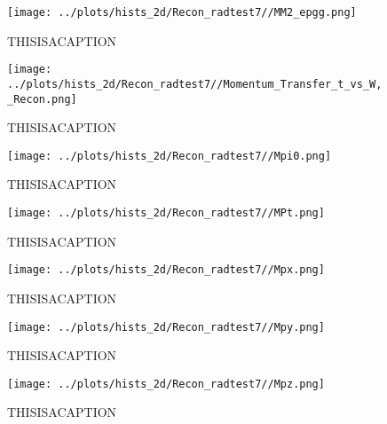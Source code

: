 \documentclass{article}
\begin{document}
\begin{landscape}
\begin{figure}[ht]
        \texttt{[image: ../plots/hists\_2d/Recon\_radtest7//MM2\_epgg.png]}
        \captionsetup{textformat=empty,labelformat=blank}
        \caption{THISISACAPTION}
    \end{figure}
    \clearpage
    
    \begin{figure}[ht]
        \centering

        \texttt{[image: ../plots/hists\_2d/Recon\_radtest7//Momentum\_Transfer\_t\_vs\_W,\_Recon.png]}
        \captionsetup{textformat=empty,labelformat=blank}
        \caption{THISISACAPTION}
    \end{figure}
    \clearpage
    
    \begin{figure}[ht]
        \centering

        \texttt{[image: ../plots/hists\_2d/Recon\_radtest7//Mpi0.png]}
        \captionsetup{textformat=empty,labelformat=blank}
        \caption{THISISACAPTION}
    \end{figure}
    \clearpage
    
    \begin{figure}[ht]
        \centering

        \texttt{[image: ../plots/hists\_2d/Recon\_radtest7//MPt.png]}
        \captionsetup{textformat=empty,labelformat=blank}
        \caption{THISISACAPTION}
    \end{figure}
    \clearpage
    
    \begin{figure}[ht]
        \centering

        \texttt{[image: ../plots/hists\_2d/Recon\_radtest7//Mpx.png]}
        \captionsetup{textformat=empty,labelformat=blank}
        \caption{THISISACAPTION}
    \end{figure}
    \clearpage
    
    \begin{figure}[ht]
        \centering

        \texttt{[image: ../plots/hists\_2d/Recon\_radtest7//Mpy.png]}
        \captionsetup{textformat=empty,labelformat=blank}
        \caption{THISISACAPTION}
    \end{figure}
    \clearpage
    
    \begin{figure}[ht]
        \centering

        \texttt{[image: ../plots/hists\_2d/Recon\_radtest7//Mpz.png]}
        \captionsetup{textformat=empty,labelformat=blank}
        \caption{THISISACAPTION}
    \end{figure}
    \clearpage
    

\end{landscape}
\end{document}
